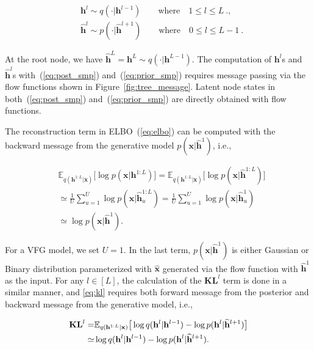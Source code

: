 \documentclass[sigconf, anonymous, review]{acmart}
\theoremstyle{plain}
\theoremstyle{definition}
\theoremstyle{remark}
\begin{document}
\vspace{-0.15in}
\begin{align} \label{eq:post_smp}
 &\mathbf{h}^l \sim q(\cdot | \mathbf{h}^{l-1})  \quad \quad \textrm{where} \quad 1\leqslant l \leqslant L \ ., \\  \label{eq:prior_smp}
 &\widehat{\mathbf{h}}^l \sim p(\cdot | \widehat{\mathbf{h}}^{l+1}) \quad \quad \textrm{where} \quad 0\leqslant l \leqslant L-1 \ .
 \end{align}
 
\vspace{-0.15in}
\noindent At the root node,  we have $\widehat{\mathbf{h}}^L=\mathbf{h}^L \sim q(\cdot | \mathbf{h}^{L-1}) $.  
The computation of $ \mathbf{h}^l$s and $\widehat{\mathbf{h}}^l$s with~(\ref{eq:post_smp}) and~(\ref{eq:prior_smp}) requires message passing via the flow functions shown in Figure~\ref{fig:tree_message}. Latent node states in both~(\ref{eq:post_smp}) and~(\ref{eq:prior_smp})  are directly obtained with flow functions.

The reconstruction term in ELBO~(\ref{eq:elbo}) can be computed with the backward message from the generative model $p(\mathbf{x}| \widehat{\mathbf{h}}^{1})$, i.e.,

\vspace{-0.15in}
\begin{align*} 
&\mathbb{E}_{q(\mathbf{h}^{1:L}|\mathbf{x})}\big[ \log p(\mathbf{x}|\mathbf{h}^{1:L})\big]
=\mathbb{E}_{q(\mathbf{h}^{1:L}|\mathbf{x})}\big[ \log p(\mathbf{x}|\widehat{\mathbf{h}}^{1:L})  \big] \\
&\simeq \frac{1}{U}\sum_{u=1}^U \log p(\mathbf{x}| \widehat{\mathbf{h}}^{1:L}_u) = \frac{1}{U}\sum_{u=1}^U \log p(\mathbf{x}| \widehat{\mathbf{h}}^{1}_u)\\ & \simeq   \log p(\mathbf{x}| \widehat{\mathbf{h}}^{1}) .
 \end{align*}

\vspace{-0.15in}
\noindent For a VFG model, we set $U=1$. In the last term,  $p(\mathbf{x}| \widehat{\mathbf{h}}^{1})$ is either Gaussian or Binary distribution parameterized with $\widehat{\mathbf{x}}$ generated via the flow function with $\widehat{\mathbf{h}}^{1}$ as the input.  For any $l \in [L]$, the calculation of the $\mathbf{KL}^l$ term is done in a similar manner, and  \eqref{eq:kl} requires  both  forward message  from  the posterior and backward message from the generative model, i.e.,

\vspace{-0.15in}
\begin{align}\label{eq:KL_l}
\mathbf{KL}^l=&\mathbb{E}_{q(\mathbf{h}^{1:L}|\mathbf{x})}\big[  \log q(\mathbf{h}^{l}|\mathbf{h}^{l-1})   - \log p(\mathbf{h}^{l}|\widehat{\mathbf{h}}^{l+1}) \big] \\ \notag
\simeq & \log q(\mathbf{h}^{l}|\mathbf{h}^{l-1})   - \log p(\mathbf{h}^{l}|\widehat{\mathbf{h}}^{l+1}).
\end{align} 
\end{document}

